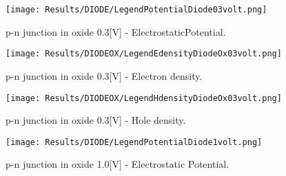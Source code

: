 \clearpage


\begin{figure}[!h]
\centering
{}
\hspace{0.1\textwidth}
\hspace{0.04\textwidth}
{\texttt{[image: Results/DIODE/LegendPotentialDiode03volt.png]}}
\caption{p-n junction in oxide 0.3[V] - ElectrostaticPotential.}
\label{fig: potential diodeox}
\end{figure}

\vspace{0.5cm}

\begin{figure}[!h]
\centering
{}
\hspace{0.1\textwidth}
\hspace{0.04\textwidth}
{\texttt{[image: Results/DIODEOX/LegendEdensityDiodeOx03volt.png]}}
\caption{p-n junction in oxide 0.3[V] - Electron density.}
\label{fig: edensity diodeox}
\end{figure}

\vspace{0.5cm}

\begin{figure}[!h]
\centering
{}
\hspace{0.1\textwidth}
\hspace{0.04\textwidth}
{\texttt{[image: Results/DIODEOX/LegendHdensityDiodeOx03volt.png]}}
\caption{p-n junction in oxide 0.3[V] - Hole density.}
\label{fig: hdensity diodeox}
\end{figure}

\clearpage


\begin{figure}[!h]
\centering
{}
\hspace{0.1\textwidth}
\hspace{0.04\textwidth}
{\texttt{[image: Results/DIODE/LegendPotentialDiode1volt.png]}}
\caption{p-n junction in oxide 1.0[V] - Electrostatic Potential.}
\label{fig: potential diodeox 1V}
\end{figure}

